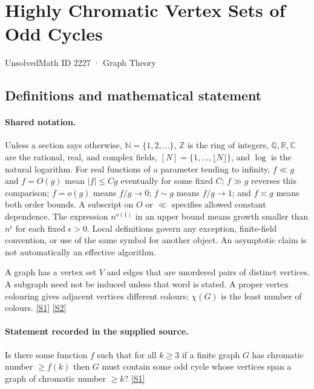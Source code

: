 \documentclass[11pt,a4paper]{article}
\newcommand{\N}{\mathbb{N}}
\newcommand{\Z}{\mathbb{Z}}
\newcommand{\Q}{\mathbb{Q}}
\newcommand{\R}{\mathbb{R}}
\newcommand{\C}{\mathbb{C}}
\newcommand{\sref}[2]{\hyperlink{source:#1:#2}{[S#2]}}
\begin{document}

\setcounter{section}{2226}

\section{Highly Chromatic Vertex Sets of Odd Cycles}\label{2227}

{\small\sffamily UnsolvedMath ID 2227 · Graph Theory}

\subsection{Definitions and mathematical statement}

\paragraph{Shared notation.}Unless a section says otherwise, $\N=\{1,2,\ldots\}$,
$\Z$ is the ring of integers, $\Q,\R,\C$ are the rational, real, and complex
fields, $[N]=\{1,\ldots,\lfloor N\rfloor\}$, and $\log$ is the natural
logarithm. For real functions of a parameter tending to infinity,
$f\ll g$ and $f=O(g)$ mean $|f|\leq Cg$ eventually for some fixed $C$;
$f\gg g$ reverses this comparison; $f=o(g)$ means $f/g\to0$;
$f\sim g$ means $f/g\to1$; and $f\asymp g$ means both order bounds.
A subscript on $O$ or $\ll$ specifies allowed constant dependence.
The expression $n^{o(1)}$ in an upper bound means growth smaller than
$n^\epsilon$ for each fixed $\epsilon>0$. Local definitions govern any
exception, finite-field convention, or use of the same symbol for another
object. An asymptotic claim is not automatically an effective algorithm.



A graph has a vertex set $V$ and edges that are unordered pairs of distinct vertices. A subgraph need not be induced unless that word is stated. A proper vertex colouring gives adjacent vertices different colours; $\chi(G)$ is the least number of colours. \sref{2227}{1} \sref{2227}{2}

\paragraph{Statement recorded in the supplied source.}
Is there some function $f$ such that for all $k\geq 3$ if a finite graph $G$ has chromatic number $\geq f(k)$ then $G$ must contain some odd cycle whose vertices span a graph of chromatic number $\geq k$? \sref{2227}{1}
\end{document}
